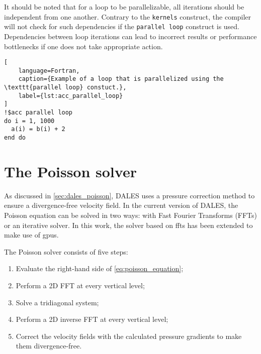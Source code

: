 It should be noted that for a loop to be parallelizable, all iterations should be independent from one another. Contrary to the \texttt{kernels} construct, the compiler will not check for such dependencies if the \texttt{parallel loop} construct is used. Dependencies between loop iterations can lead to incorrect results or performance bottlenecks if one does not take appropriate action. 

\begin{lstlisting}[
    language=Fortran,
    caption={Example of a loop that is parallelized using the \texttt{parallel loop} constuct.},
    label={lst:acc_parallel_loop}
]
!$acc parallel loop
do i = 1, 1000
  a(i) = b(i) + 2
end do
\end{lstlisting}

\section{The Poisson solver} \label{sec:poisson_solver}
As discussed in \autoref{sec:dales_poisson}, DALES uses a pressure correction method to ensure a divergence-free velocity field. In the current version of DALES, the Poisson equation can be solved in two ways: with Fast Fourier Transforms (FFTs) or an iterative solver. In this work, the solver based on \acrshort{fft}s has been extended to make use of \acrshort{gpu}s.

The Poisson solver consists of five steps:

\begin{enumerate}
  \item Evaluate the right-hand side of \autoref{eq:poisson_equation};
  \item Perform a 2D FFT at every vertical level;
  \item Solve a tridiagonal system;
  \item Perform a 2D inverse FFT at every vertical level;
  \item Correct the velocity fields with the calculated pressure gradients to make them divergence-free.
\end{enumerate}

